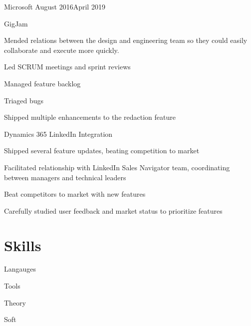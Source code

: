 \documentclass[]{../resume}
\begin{document}
\begin{employer}[../microsoft]{Microsoft} {August 2016}{April 2019}
\begin{team}{GigJam}
  \begin{bullets}
  \item Mended relations between the design
    and engineering team
    so they could easily collaborate
    and execute more quickly.
  \item Led SCRUM meetings and sprint reviews
  \item Managed feature backlog
  \item Triaged bugs
  \item Shipped multiple enhancements to the redaction feature
  \end{bullets}
\end{team}
\begin{team}{Dynamics 365 LinkedIn Integration}
  \begin{bullets}
  \item Shipped several feature updates,
    beating competition to market
  \item Facilitated relationship with LinkedIn Sales Navigator team,
    coordinating between managers
    and technical leaders
  \item Beat competitors to market with new features
  \item Carefully studied user feedback and
    market status to
    prioritize features
  \end{bullets}
\end{team}
\end{employer}

\newcolumn


\section{Skills}

\begin{skilltable}{Langauges}
\end{skilltable}

\begin{skilltable}{Tools}
\end{skilltable}

\begin{skilltable}{Theory}
\end{skilltable}

\begin{skilltable}{Soft}
\end{skilltable}
    
\end{document}
